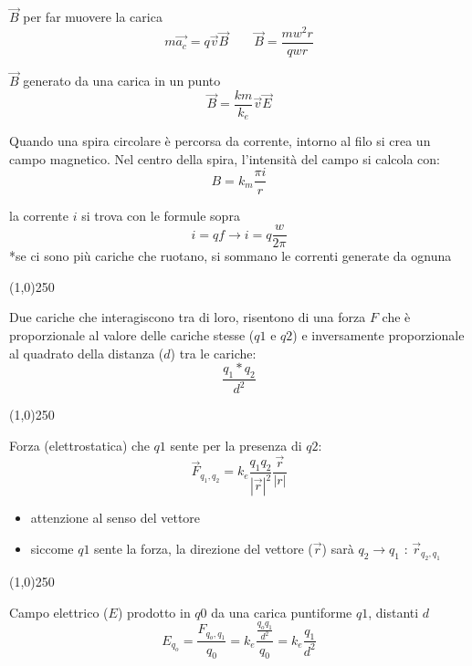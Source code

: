 \documentclass[14pt]{extarticle}
\begin{document}
$\overrightarrow{B}$ per far muovere la carica
\begin{equation*}
    m\overrightarrow{a_c}=q\overrightarrow{v}\overrightarrow{B}
    \quad\quad
    \overrightarrow{B}=\frac{mw^2r}{qwr}
\end{equation*}

$\overrightarrow{B}$ generato da una carica in un punto
\begin{equation*}
    \overrightarrow{B}=\frac{km}{k_e}\overrightarrow{v}\overrightarrow{E}
\end{equation*}

Quando una spira circolare è percorsa da corrente, intorno al filo si crea 
un campo magnetico. Nel centro della spira, l'intensità del campo si calcola con:
\begin{equation*}
    B=k_m\frac{\pi i}{r}
\end{equation*}

la corrente $i$ si trova con le formule sopra
\begin{equation*}
    i = qf \rightarrow i=q\frac{w}{2\pi}
\end{equation*}
*se ci sono più cariche che ruotano, si sommano le correnti generate da ognuna
\begin{center}
    \line(1,0){250}
\end{center}

Due cariche che interagiscono tra di loro, risentono di una forza $F$ che è proporzionale al valore delle cariche stesse ($q1$ e $q2$) e inversamente proporzionale al quadrato della distanza ($d$) tra le cariche:
\begin{equation*}
    \frac{q_1*q_2}{d^2}
\end{equation*}
\begin{center}
    \line(1,0){250}
\end{center}
Forza (elettrostatica) che $q1$ sente per la presenza di $q2$:
\begin{equation*}
    \overrightarrow{F}_{q_1,q_2}=k_e\frac{q_1q_2}{|\overrightarrow{r}|^2}\frac{\overrightarrow{r}}{|r|}
\end{equation*}
\begin{itemize}
    \item attenzione al senso del vettore
    \item siccome $q1$ sente la forza, la direzione del vettore ($\overrightarrow{r}$) sarà $q_2\rightarrow q_1$ : $\overrightarrow{r}_{q_2,q_1}$
\end{itemize}


\begin{center}
    \line(1,0){250}
\end{center}
Campo elettrico ($E$) prodotto in $q0$ da una carica puntiforme $q1$, distanti $d$
\begin{equation*}
    E_{q_o}=\frac{F_{q_o,q_1}}{q_0}=k_e\frac{\frac{q_oq_1}{d^2}}{q_0}=k_e\frac{q_1}{d^2}
\end{equation*}
\end{document}

